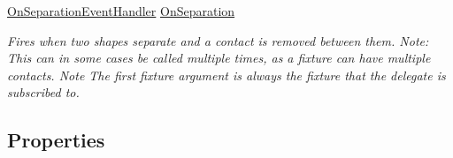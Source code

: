 \begin{DoxyCompactItemize}
\hyperlink{namespace_farseer_physics_1_1_dynamics_ade34460148f9d799a829e85e0631fc69}{On\+Separation\+Event\+Handler} \hyperlink{class_farseer_physics_1_1_dynamics_1_1_fixture_aed367fab43f4d3de4b31a9c6c70fe906}{On\+Separation}
\begin{DoxyCompactList}\small\item\em Fires when two shapes separate and a contact is removed between them. Note\+: This can in some cases be called multiple times, as a fixture can have multiple contacts. Note The first fixture argument is always the fixture that the delegate is subscribed to. \end{DoxyCompactList}\end{DoxyCompactItemize}
\subsection*{Properties}
